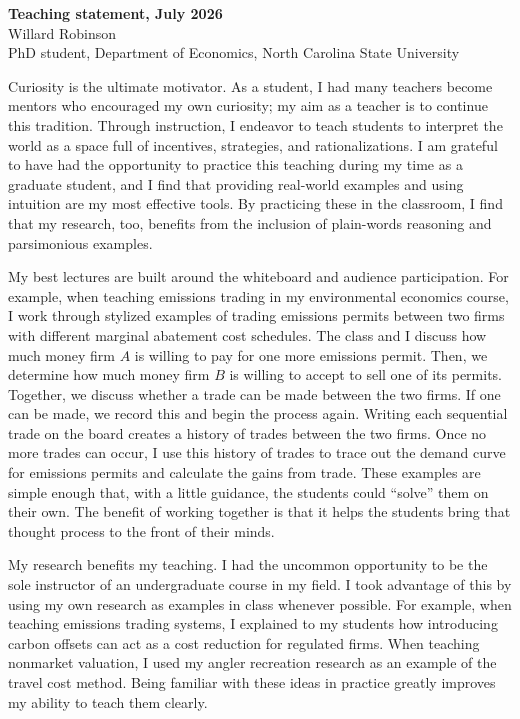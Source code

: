 \documentclass[12pt]{article}
\begin{document}
\begin{center}
    \large
    {\bfseries Teaching statement, July 2026} \\
    Willard Robinson \\
    PhD student, Department of Economics, North Carolina State University
\end{center}

\smallskip

\noindent Curiosity is the ultimate motivator. As a student, I had many teachers become mentors who encouraged my own curiosity; my aim as a teacher is to continue this tradition. Through instruction, I endeavor to teach students to interpret the world as a space full of incentives, strategies, and rationalizations. I am grateful to have had the opportunity to practice this teaching during my time as a graduate student, and I find that providing real-world examples and using intuition are my most effective tools. By practicing these in the classroom, I find that my research, too, benefits from the inclusion of plain-words reasoning and parsimonious examples.

My best lectures are built around the whiteboard and audience participation. For example, when teaching emissions trading in my environmental economics course, I work through stylized examples of trading emissions permits between two firms with different marginal abatement cost schedules. The class and I discuss how much money firm $A$ is willing to pay for one more emissions permit. Then, we determine how much money firm $B$ is willing to accept to sell one of its permits. Together, we discuss whether a trade can be made between the two firms. If one can be made, we record this and begin the process again. Writing each sequential trade on the board creates a history of trades between the two firms. Once no more trades can occur, I use this history of trades to trace out the demand curve for emissions permits and calculate the gains from trade. These examples are simple enough that, with a little guidance, the students could ``solve'' them on their own. The benefit of working together is that it helps the students bring that thought process to the front of their minds.

My research benefits my teaching. I had the uncommon opportunity to be the sole instructor of an undergraduate course in my field. I took advantage of this by using my own research as examples in class whenever possible. For example, when teaching emissions trading systems, I explained to my students how introducing carbon offsets can act as a cost reduction for regulated firms. When teaching nonmarket valuation, I used my angler recreation research as an example of the travel cost method. Being familiar with these ideas in practice greatly improves my ability to teach them clearly.
\end{document}

